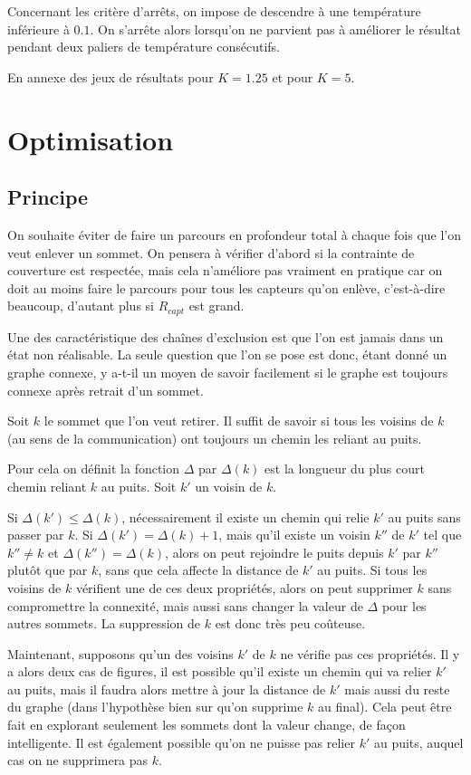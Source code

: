 \documentclass[12pt,a4paper]{article}
\begin{document}
Concernant les critère d'arrêts, on impose de descendre à une température inférieure à $0.1$. On s'arrête alors lorsqu'on ne parvient pas à améliorer le résultat pendant deux paliers de température consécutifs.

En annexe des jeux de résultats pour $K=1.25$ et pour $K=5$.
\section{Optimisation}
\subsection{Principe}
On souhaite éviter de faire un parcours en profondeur total à chaque fois que l'on veut enlever un sommet. On pensera à vérifier d'abord si la contrainte de couverture est respectée, mais cela n'améliore pas vraiment en pratique car on doit au moins faire le parcours pour tous les capteurs qu'on enlève, c'est-à-dire beaucoup, d'autant plus si $R_{capt}$ est grand.

Une des caractéristique des chaînes d'exclusion est que l'on est jamais dans un état non réalisable. La seule question que l'on se pose est donc, étant donné un graphe connexe, y a-t-il un moyen de savoir facilement si le graphe est toujours connexe après retrait d'un sommet. 

Soit $k$ le sommet que l'on veut retirer. Il suffit de savoir si tous les voisins de $k$ (au sens de la communication) ont toujours un chemin les reliant au puits.

Pour cela on définit la fonction $\Delta$ par $\Delta (k)$ est la longueur du plus court chemin reliant $k$ au puits. Soit $k'$ un voisin de $k$. 

Si $\Delta(k')\leq \Delta(k)$, nécessairement il existe un chemin qui relie $k'$ au puits sans passer par $k$. Si $\Delta(k')=\Delta(k)+1$, mais qu'il existe un voisin $k''$ de $k'$ tel que $k''\neq k$ et $\Delta(k'')=\Delta(k)$, alors on peut rejoindre le puits depuis $k'$ par $k''$ plutôt que par $k$, sans que cela affecte la distance de $k'$ au puits. Si tous les voisins de $k$ vérifient une de ces deux propriétés, alors on peut supprimer $k$ sans compromettre la connexité, mais aussi sans changer la valeur de $\Delta$ pour les autres sommets. La suppression de $k$ est donc très peu coûteuse. 

Maintenant, supposons qu'un des voisins $k'$ de $k$ ne vérifie pas ces propriétés. Il y a alors deux cas de figures, il est possible qu'il existe un chemin qui va relier $k'$ au puits, mais il faudra alors mettre à jour la distance de $k'$ mais aussi du reste du graphe (dans l'hypothèse bien sur qu'on supprime $k$ au final). Cela peut être fait en explorant seulement les sommets dont la valeur change, de façon intelligente. Il est également possible qu'on ne puisse pas relier $k'$ au puits, auquel cas on ne supprimera pas $k$.
\end{document}
